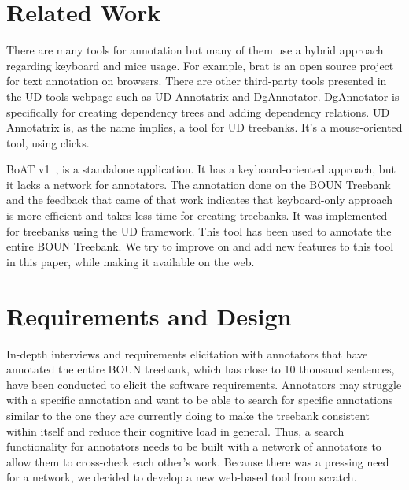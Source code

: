 \documentclass[
]{ceurart}
\begin{document}
\section{Related Work}
\label{sec:related}

There are many tools for annotation but many of them use a hybrid approach regarding keyboard and mice usage.
For example, brat is an open source project for text annotation on browsers.\cite{brat}\cite{UD}
There are other third-party tools presented in the UD tools webpage such as UD Annotatrix\cite{tyers-etal:2018} and DgAnnotator\cite{dgannotator}.
DgAnnotator is specifically for creating dependency trees and adding dependency relations.
UD Annotatrix is, as the name implies, a tool for UD treebanks.
It's a mouse-oriented tool, using clicks.

BoAT v1~\cite{turk-etal-2019-turkish}, is a standalone application.
It has a keyboard-oriented approach, but it lacks a network for annotators.
The annotation done on the BOUN Treebank and the feedback that came of that work indicates that keyboard-only approach is more efficient and takes less time for creating treebanks.
It was implemented for treebanks using the UD framework.
This tool has been used to annotate the entire BOUN Treebank.
We try to improve on and add new features to this tool in this paper, while making it available on the web.

\section{Requirements and Design}
\label{sec:requirements}

In-depth interviews and requirements elicitation with annotators that have annotated the entire BOUN treebank, which has close to 10 thousand sentences, have been conducted to elicit the software requirements.
Annotators may struggle with a specific annotation and want to be able to search for specific annotations similar to the one they are currently doing to make the treebank consistent within itself and reduce their cognitive load in general.
Thus, a search functionality for annotators needs to be built with a network of annotators to allow them to cross-check each other's work.
Because there was a pressing need for a network, we decided to develop a new web-based tool from scratch.
\end{document}
